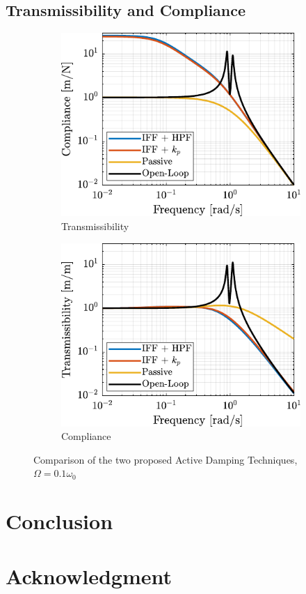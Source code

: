 \documentclass{ISMA_USD2020}
\begin{document}
\subsection{Transmissibility and Compliance}
\label{sec:org0a87dc5}
\begin{figure}[htbp]
\begin{subfigure}[c]{0.45\linewidth}
\includegraphics[width=\linewidth]{figs/comp_compliance.pdf}
\caption{\label{fig:comp_compliance} Transmissibility}
\end{subfigure}
\begin{subfigure}[c]{0.45\linewidth}
\includegraphics[width=\linewidth]{figs/comp_transmissibility.pdf}
\caption{\label{fig:comp_transmissibility} Compliance}
\end{subfigure}
\caption{\label{fig:comp_active_damping}Comparison of the two proposed Active Damping Techniques, \(\Omega = 0.1 \omega_0\)}
\centering
\end{figure}

\section{Conclusion}
\label{sec:orgcf2c965}
\label{sec:conclusion}

\section*{Acknowledgment}
\label{sec:orga6bcde3}


\end{document}
